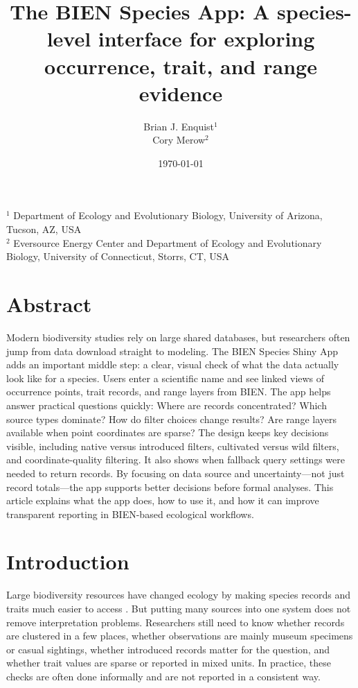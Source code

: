 \documentclass[11pt]{article}
\title{The BIEN Species App: A species-level interface for exploring occurrence, trait, and range evidence}
\author{
Brian J. Enquist$^{1}$ \\ 
Cory Merow$^{2}$
}
\date{\today}
\begin{document}
\maketitle
\noindent $^{1}$ Department of Ecology and Evolutionary Biology, University of Arizona, Tucson, AZ, USA \\
\noindent $^{2}$ Eversource Energy Center and Department of Ecology and Evolutionary Biology, University of Connecticut, Storrs, CT, USA

\linenumbers

\section*{Abstract}
Modern biodiversity studies rely on large shared databases, but researchers often jump from data download straight to modeling. The BIEN Species Shiny App adds an important middle step: a clear, visual check of what the data actually look like for a species. Users enter a scientific name and see linked views of occurrence points, trait records, and range layers from BIEN. The app helps answer practical questions quickly: Where are records concentrated? Which source types dominate? How do filter choices change results? Are range layers available when point coordinates are sparse? The design keeps key decisions visible, including native versus introduced filters, cultivated versus wild filters, and coordinate-quality filtering. It also shows when fallback query settings were needed to return records. By focusing on data source and uncertainty---not just record totals---the app supports better decisions before formal analyses. This article explains what the app does, how to use it, and how it can improve transparent reporting in BIEN-based ecological workflows.

\section*{Introduction}
Large biodiversity resources have changed ecology by making species records and traits much easier to access \citep{Enquist2026BIEN, Maitner2025BIEN}. But putting many sources into one system does not remove interpretation problems. Researchers still need to know whether records are clustered in a few places, whether observations are mainly museum specimens or casual sightings, whether introduced records matter for the question, and whether trait values are sparse or reported in mixed units. In practice, these checks are often done informally and are not reported in a consistent way.
\end{document}
